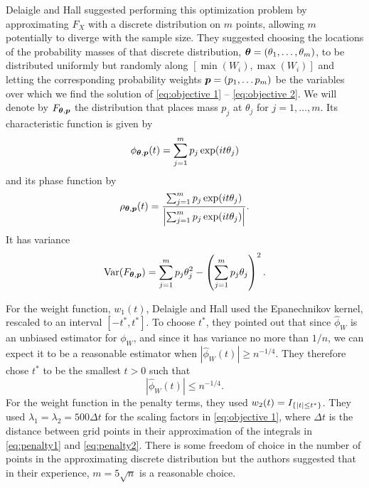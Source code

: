 	Delaigle and Hall \cite{Delaigle2016-la} suggested performing this optimization problem by approximating $F_X$ with a discrete distribution on $m$ points, allowing $m$ potentially to diverge with the sample size. They suggested choosing the locations of the probability masses of that discrete distribution, ${\bm{{\theta}}} = (\theta_1, \dots, \theta_m)$, to be distributed uniformly but randomly along $[\min(W_i), \max(W_i)]$ and letting the corresponding probability weights ${\bm{{p}}} = (p_1, \dots p_m)$ be the variables over which we find the solution of \eqref{eq:objective 1} -- \eqref{eq:objective 2}. We will denote by $F_{{\bm{{\theta}}}, {\bm{{p}}}}$ the distribution that places mass $p_j$ at $\theta_j$ for $j = 1,\dots, m$. Its characteristic function is given by
	\begin{equation}
		\phi_{{\bm{{\theta}}}, {\bm{{p}}}}(t) = \sum_{j = 1}^m p_j \exp(it\theta_j)
	\end{equation}
	and its phase function by
	\begin{equation}
		\rho_{{\bm{{\theta}}}, {\bm{{p}}}}(t) = \frac{ \sum_{j = 1}^m p_j \exp(it\theta_j)}{\left| \sum_{j = 1}^m p_j \exp(it\theta_j)\right|}.
	\end{equation}
	It has variance
	\begin{equation}
		\mathrm{Var}(F_{{\bm{{\theta}}}, {\bm{{p}}}}) = \sum_{j = 1}^m p_j \theta_j^2 - \left( \sum_{j=1}^m p_j \theta_j \right)^2.
	\end{equation}

	For the weight function, $w_1(t)$, Delaigle and Hall \cite{Delaigle2016-la} used the Epanechnikov kernel, rescaled to an interval $[-t^*, t^*]$. To choose $t^*$, they pointed out that since $\hat{\phi}_W$ is an unbiased estimator for $\phi_W$, and since it has variance no more than $1/n$, we can expect it to be a reasonable estimator when $|\hat{\phi}_W(t)| \geq n^{-1/4}$. They therefore chose $t^*$ to be the smallest $t > 0$ such that 
	\begin{equation}
	\label{eq:define t star}
		\left|\hat{\phi}_W(t)\right| \leq n^{-1/4}.
	\end{equation}
	For the weight function in the penalty terms, they used $w_2(t) = I_{\{|t| \leq t^*\}}$. They used $\lambda_1 = \lambda_2 = 500 \Delta t$ for the scaling factors in \eqref{eq:objective 1}, where $\Delta t$ is the distance between grid points in their approximation of the integrals in \eqref{eq:penalty1} and \eqref{eq:penalty2}.
	There is some freedom of choice in the number of points in the approximating discrete distribution but the authors suggested that in their experience, $m = 5\sqrt{n}$ is a reasonable choice.

